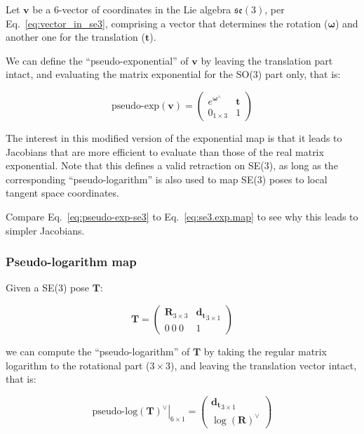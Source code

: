 \documentclass[a4paper,11pt]{report}
\newcommand{\W}{{\bm{\omega}}}
\newcommand{\hatop}[1]{#1^\wedge}
\begin{document}
Let $\mathbf{v}$ be a 6-vector of coordinates in
the Lie algebra $\mathfrak{se}(3)$, per Eq.~\ref{eq:vector_in_se3}, 
comprising a vector that determines the rotation ($\W$)
and another one for the translation ($\mathbf{t}$).

We can define the ``pseudo-exponential'' of $\mathbf{v}$
by leaving the translation part intact, and evaluating the 
matrix exponential for the SO(3) part only, that is:

\begin{equation}
\label{eq:pseudo-exp-se3}
\text{pseudo-exp}(\mathbf{v}) = 
\left(
\begin{array}{cc}
  e^{\hatop{\W}} & \mathbf{t} \\
   0_{1 \times 3} & 1
\end{array}
\right)
\end{equation}

The interest in this modified version of the exponential map 
is that it leads to Jacobians that are more efficient to evaluate
than those of the real matrix exponential.
Note that this defines a valid retraction on SE(3), as long as the corresponding ``pseudo-logarithm'' 
is also used to map SE(3) poses to local tangent space coordinates.

Compare Eq.~\ref{eq:pseudo-exp-se3} to Eq.~\ref{eq:se3.exp.map} to see why this leads to simpler Jacobians.



\subsubsection{Pseudo-logarithm map}
\label{sect:se3_pseudo-log}

Given a SE(3) pose $\mathbf{T}$: 

\begin{equation}
\mathbf{T} =
\left(
\begin{array}{c|c}
 \mathbf{R}_{3 \times 3}  & \mathbf{d_{t}}_{3 \times 1}  \\
\hline
  0 ~ 0 ~ 0 & 1
\end{array}
\right)
\end{equation}

\noindent we can compute the ``pseudo-logarithm'' of $\mathbf{T}$
by taking the regular matrix logarithm to the rotational part ($3 \times 3$), and leaving the translation vector intact, that is: 

\begin{equation}
\label{eq:pseudo-log-se3}
\left. \text{pseudo-log}(\mathbf{T})^\vee \right|_{6 \times 1} = 
\left(
\begin{array}{c}
\mathbf{d_{t}}_{3 \times 1} \\
\log(\mathbf{R})^\vee
\end{array}
\right)
\end{equation}
\end{document}
